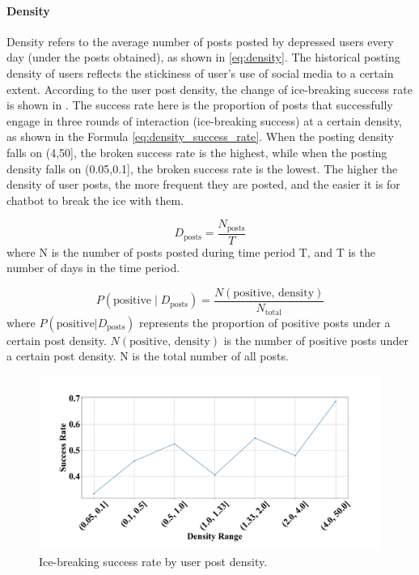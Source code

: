 \paragraph{Density}
Density refers to the average number of posts posted by depressed users every day (under the posts obtained), as shown in \eqref{eq:density}. The historical posting density of users reflects the stickiness of user's use of social media to a certain extent.
According to the user post density, the change of ice-breaking success rate is shown in . The success rate here is the proportion of posts that successfully engage in three rounds of interaction (ice-breaking success) at a certain density, as shown in the Formula \ref{eq:density_success_rate}.
When the posting density falls on (4,50], the broken success rate is the highest, while when the posting density falls on (0.05,0.1], the broken success rate is the lowest.
The higher the density of user posts, the more frequent they are posted, and the easier it is for chatbot to break the ice with them.

\begin{equation}
    D_{\text{posts}} = \frac{N_{\text{posts}}}{T}
    \label{eq:density}
\end{equation}
\noindent
where N is the number of posts posted during time period T, and T is the number of days in the time period.

\begin{equation}
    P(\text{positive} \mid D_{\text{posts}}) = \frac{N(\text{positive, density})}{N_{\text{total}}}
    \label{eq:density_success_rate}
\end{equation}
\noindent
where $P (\text{positive} | D_\text{posts})$ represents the proportion of positive posts under a certain post density. $N(\text{positive, density})$ is the number of positive posts under a certain post density. N is the total number of all posts.

\begin{figure}[th]
    \centering
    \includegraphics[width=1\columnwidth]{images/success_density.png}
    \caption{Ice-breaking success rate by user post density.}
    \label{fig:success_density}
\end{figure}

